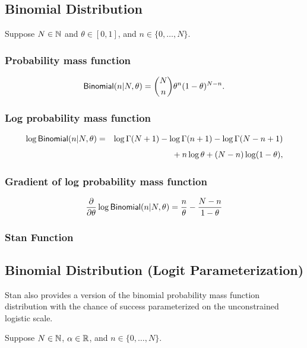\subsection{Binomial Distribution}

Suppose $N \in \mathbb{N}$ and $\theta \in [0,1]$, and $n \in
\{0,\ldots,N\}$.  

\subsubsection{Probability mass function}
\[
\mbox{\sf Binomial}(n|N,\theta)
= {N \choose n} \theta^n (1 - \theta)^{N - n}.
\]

\subsubsection{Log probability mass function}
%
\begin{eqnarray*}
\log \mbox{\sf Binomial}(n|N,\theta)
& = &
\log \Gamma(N+1) - \log \Gamma(n + 1) - \log \Gamma(N- n + 1)
\\[4pt]
& & { } + n \log \theta + (N - n) \log (1 - \theta), 
\end{eqnarray*}
%
\subsubsection{Gradient of log probability mass function}
%
\[
\frac{\partial}{\partial \theta} \log \mbox{\sf Binomial}(n|N,\theta)
= \frac{n}{\theta}
- \frac{N - n}{1 - \theta}
\]
\subsubsection{Stan Function}
%
\begin{description}
%
%
\end{description}


\subsection{Binomial Distribution (Logit Parameterization)}

Stan also provides a version of the binomial probability mass function
distribution with the chance of success parameterized on the
unconstrained logistic scale.  

Suppose $N \in \mathbb{N}$, $\alpha \in \mathbb{R}$, and $n \in
\{0,\ldots,N\}$.

